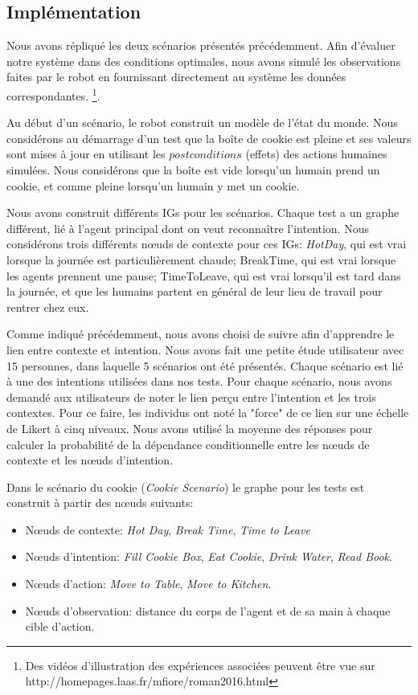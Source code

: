 \documentclass[a4paper,11pt,twoside]{StyleThese}
\begin{document}
\subsection{Implémentation}
\label{sec:expeRobotIntent}
Nous avons répliqué les deux scénarios présentés précédemment. Afin d'évaluer notre système dans des conditions optimales, nous avons simulé les observations faites par le robot en fournissant directement au système les données correspondantes.  \footnote{Des vidéos d'illustration des expériences associées peuvent être vue sur  http://homepages.laas.fr/mfiore/roman2016.html}. 

Au début d'un scénario, le robot construit un modèle de l'état du monde. Nous considérons au démarrage d'un test que la boîte de cookie est pleine et ses valeurs sont mises à jour en utilisant les $postconditions$ (effets) des actions humaines simulées. Nous considérons que la boîte est vide lorsqu'un humain prend un cookie, et comme pleine lorsqu'un humain y met un cookie.

Nous avons construit différents IGs pour les scénarios. Chaque test a un graphe différent, lié à l'agent principal dont on veut reconnaître l'intention. Nous considérons trois différents nœuds de contexte pour ces IGs: \textit{HotDay}, qui est vrai lorsque la journée est particulièrement chaude; BreakTime, qui est vrai lorsque les agents prennent une pause; TimeToLeave, qui est vrai lorsqu'il est tard dans la journée, et que les humains partent en général de leur lieu de travail pour rentrer chez eux.

Comme indiqué précédemment, nous avons choisi de suivre \cite{Liu2014} afin d'apprendre le lien entre contexte et intention. Nous avons fait une petite étude utilisateur avec 15 personnes, dans laquelle 5 scénarios ont été présentés. Chaque scénario est lié à une des intentions utilisées dans nos tests. Pour chaque scénario, nous avons demandé aux utilisateurs de noter le lien perçu entre l'intention et les trois contextes. Pour ce faire, les individus ont noté la "force" de ce lien sur une échelle de Likert à cinq niveaux. Nous avons utilisé la moyenne des réponses pour calculer la probabilité de la dépendance conditionnelle entre les nœuds de contexte et les nœuds d'intention.


Dans le scénario  du cookie (\textit{Cookie Scenario}) le graphe pour les tests est construit à partir des nœuds suivants:
\begin{itemize}
\item Nœuds de contexte: \textit{Hot Day}, \textit{Break Time}, \textit{Time to Leave}
\item Nœuds d'intention: \textit{Fill Cookie Box}, \textit{Eat Cookie}, \textit{Drink Water}, \textit{Read Book}.
\item Nœuds d'action: \textit{Move to Table}, \textit{Move to Kitchen}.
\item Nœuds d'observation: distance du corps de l'agent et de sa main à chaque cible d'action.
\end{itemize}
\end{document}
